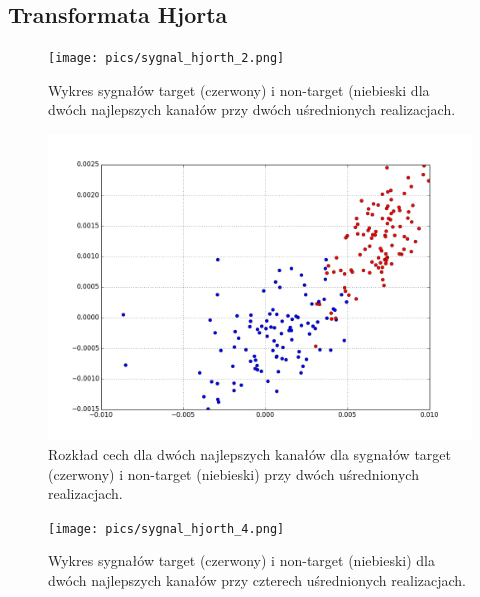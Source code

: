 \documentclass[licencjacka,openright]{pracamgr}
\begin{document}
\subsection{Transformata Hjorta}

\begin{figure}[H]
\centering
\texttt{[image: pics/sygnal\_hjorth\_2.png]}
\caption{Wykres sygnałów target (czerwony) i non-target (niebieski dla dwóch najlepszych kanałów przy dwóch uśrednionych realizacjach.}
\label{sygnal_hjorth_2}
\end{figure}

\begin{figure}[H]
\centering
\includegraphics[scale=0.55, trim=0mm 0mm 0mm 0mm, clip=True]{pics/cecha_hjorth_2.png}
\caption{Rozkład cech dla dwóch najlepszych kanałów dla sygnałów target (czerwony) i non-target (niebieski) przy dwóch uśrednionych realizacjach.}
\label{cecha_hjorth_2}
\end{figure}

\begin{figure}[H]
\centering
\texttt{[image: pics/sygnal\_hjorth\_4.png]}
\caption{Wykres sygnałów target (czerwony) i non-target (niebieski) dla dwóch najlepszych kanałów przy czterech uśrednionych realizacjach.}
\label{sygnal_hjorth_4}
\end{figure}
\end{document}
